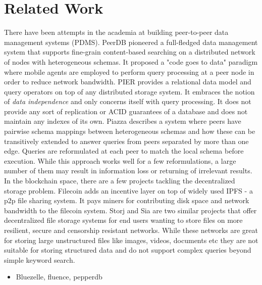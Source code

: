 \section{Related Work}
There have been attempts in the academia at building peer-to-peer data management systems (PDMS). PeerDB \cite{PeerDB} pioneered a full-fledged data management system that supports fine-grain content-based searching on a distributed network of nodes with heterogeneous schemas. It proposed a "code goes to data" paradigm where mobile agents are employed to perform query processing at a peer node in order to reduce network bandwidth. PIER \cite{PIER} provides a relational data model and query operators on top of any distributed storage system. It embraces the notion of \textit{data independence} and only concerns itself with query processing. It does not provide any sort of replication or ACID guarantees of a database and does not maintain any indexes of its own. Piazza \cite{Piazza} describes a system where peers have pairwise schema mappings between heterogeneous schemas and how these can be transitively extended to answer queries from peers separated by more than one edge. Queries are reformulated at each peer to match the local schema before execution. While this approach works well for a few reformulations, a large number of them may result in information loss or returning of irrelevant results.
\newline\newline
In the blockchain space, there are a few projects tackling the decentralized storage problem. Filecoin \cite{Filecoin} adds an incentive layer on top of widely used IPFS \cite{IPFS} - a p2p file sharing system. It pays miners for contributing disk space and network bandwidth to the filecoin system. Storj \cite{Storj} and Sia \cite{Sia} are two similar projects that offer decentralized file storage systems for end users wanting to store files on more resilient, secure and censorship resistant networks. While these networks are great for storing large unstructured files like images, videos, documents etc they are not suitable for storing structured data and do not support complex queries beyond simple keyword search.

    \begin{itemize}
        \item Bluezelle, fluence, pepperdb
    \end{itemize}


